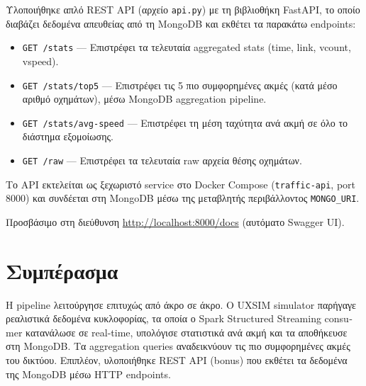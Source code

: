 \documentclass[11pt,a4paper]{article}
\begin{document}
Υλοποιήθηκε απλό \textlatin{REST API} (αρχείο \texttt{\textlatin{api.py}}) με τη βιβλιοθήκη \textlatin{FastAPI}, το οποίο διαβάζει δεδομένα απευθείας από τη \textlatin{MongoDB} και εκθέτει τα παρακάτω \textlatin{endpoints}:

\begin{itemize}
    \item \texttt{\textlatin{GET /stats}} — Επιστρέφει τα τελευταία \textlatin{aggregated stats} (\textlatin{time}, \textlatin{link}, \textlatin{vcount}, \textlatin{vspeed}).
    \item \texttt{\textlatin{GET /stats/top5}} — Επιστρέφει τις 5 πιο συμφορημένες ακμές (κατά μέσο αριθμό οχημάτων), μέσω \textlatin{MongoDB aggregation pipeline}.
    \item \texttt{\textlatin{GET /stats/avg-speed}} — Επιστρέφει τη μέση ταχύτητα ανά ακμή σε όλο το διάστημα εξομοίωσης.
    \item \texttt{\textlatin{GET /raw}} — Επιστρέφει τα τελευταία \textlatin{raw} αρχεία θέσης οχημάτων.
\end{itemize}

Το \textlatin{API} εκτελείται ως ξεχωριστό \textlatin{service} στο \textlatin{Docker Compose} (\textlatin{\texttt{traffic-api}}, \textlatin{port} \textlatin{8000}) και \mbox{συνδέεται} στη \textlatin{MongoDB} μέσω της μεταβλητής περιβάλλοντος \textlatin{\texttt{MONGO\_URI}}.

Προσβάσιμο στη διεύθυνση \textlatin{\url{http://localhost:8000/docs}} (αυτόματο \textlatin{Swagger UI}).

\section{Συμπέρασμα}

Η \textlatin{pipeline} λειτούργησε επιτυχώς από άκρο σε άκρο. Ο \textlatin{UXSIM simulator} παρήγαγε ρεαλιστικά δεδομένα κυκλοφορίας, τα οποία ο \textlatin{Spark Structured Streaming consumer} \mbox{κατανάλωσε} σε \textlatin{real-time}, υπολόγισε \mbox{στατιστικά} ανά ακμή και τα αποθήκευσε στη \textlatin{MongoDB}. Τα \textlatin{aggregation queries} αναδεικνύουν τις πιο συμφορημένες ακμές του δικτύου. Επιπλέον, υλοποιήθηκε \textlatin{REST API} (\textlatin{bonus}) που εκθέτει τα δεδομένα της \textlatin{MongoDB} μέσω \textlatin{HTTP endpoints}.
\end{document}
